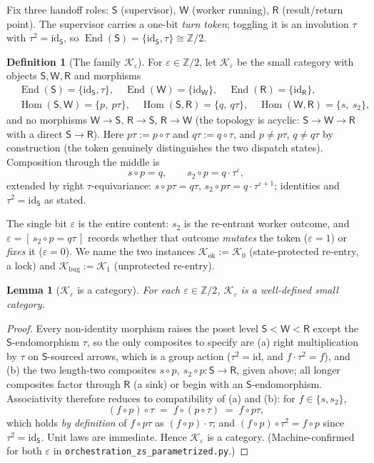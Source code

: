 \documentclass[11pt]{article}
\newtheorem{lemma}[theorem]{Lemma}
\theoremstyle{definition}
\newtheorem{definition}[theorem]{Definition}
\newcommand{\Hom}{\operatorname{Hom}}
\newcommand{\End}{\operatorname{End}}
\newcommand{\id}{\mathrm{id}}
\newcommand{\K}{\mathcal{K}}
\newcommand{\Sup}{\mathsf{S}}
\newcommand{\Wk}{\mathsf{W}}
\newcommand{\Rt}{\mathsf{R}}
\begin{document}
Fix three handoff roles: $\Sup$ (supervisor), $\Wk$ (worker running), $\Rt$
(result/return point). The supervisor carries a one-bit \emph{turn token}; toggling
it is an involution $\tau$ with $\tau^2=\id_\Sup$, so
$\End(\Sup)=\{\id_\Sup,\tau\}\cong\mathbb Z/2$.

\begin{definition}[The family $\K_\varepsilon$]\label{def:Keps}
For $\varepsilon\in\mathbb Z/2$, let $\K_\varepsilon$ be the small category with
objects $\Sup,\Wk,\Rt$ and morphisms
\[
\begin{aligned}
&\End(\Sup)=\{\id_\Sup,\tau\},\quad \End(\Wk)=\{\id_\Wk\},\quad \End(\Rt)=\{\id_\Rt\},\\
&\Hom(\Sup,\Wk)=\{p,\ p\tau\},\quad
 \Hom(\Sup,\Rt)=\{q,\ q\tau\},\quad
 \Hom(\Wk,\Rt)=\{s,\ s_2\},
\end{aligned}
\]
and no morphisms $\Wk\to\Sup$, $\Rt\to\Sup$, $\Rt\to\Wk$ (the topology is acyclic:
$\Sup\to\Wk\to\Rt$ with a direct $\Sup\to\Rt$). Here $p\tau:=p\circ\tau$ and
$q\tau:=q\circ\tau$, and $p\neq p\tau$, $q\neq q\tau$ by construction (the token
genuinely distinguishes the two dispatch states). Composition through the middle is
\[
   s\circ p=q,\qquad s_2\circ p=q\cdot\tau^{\varepsilon},
\]
extended by right $\tau$-equivariance:
$s\circ p\tau=q\tau$, $s_2\circ p\tau=q\cdot\tau^{\varepsilon+1}$; identities and
$\tau^2=\id_\Sup$ as stated.
\end{definition}

The single bit $\varepsilon$ is the entire content: $s_2$ is the re-entrant worker
outcome, and $\varepsilon=[\,s_2\circ p=q\tau\,]$ records whether that outcome
\emph{mutates} the token ($\varepsilon=1$) or \emph{fixes} it ($\varepsilon=0$). We
name the two instances $\K_{\mathrm{ok}}:=\K_0$ (state-protected re-entry, a lock)
and $\K_{\mathrm{bug}}:=\K_1$ (unprotected re-entry).

\begin{lemma}[$\K_\varepsilon$ is a category]\label{lem:cat}
For each $\varepsilon\in\mathbb Z/2$, $\K_\varepsilon$ is a well-defined small
category.
\end{lemma}

\begin{proof}
Every non-identity morphism raises the poset level $\Sup<\Wk<\Rt$ except the
$\Sup$-endomorphism $\tau$, so the only composites to specify are (a) right
multiplication by $\tau$ on $\Sup$-sourced arrows, which is a group action
($\tau^2=\id$, and $f\cdot\tau^2=f$), and (b) the two length-two composites
$s\circ p,\ s_2\circ p:\Sup\to\Rt$, given above; all longer composites factor
through $\Rt$ (a sink) or begin with an $\Sup$-endomorphism. Associativity therefore
reduces to compatibility of (a) and (b): for $f\in\{s,s_2\}$,
\[
   (f\circ p)\circ\tau \;=\; f\circ(p\circ\tau) \;=\; f\circ p\tau,
\]
which holds \emph{by definition} of $f\circ p\tau$ as $(f\circ p)\cdot\tau$; and
$(f\circ p)\circ\tau^2=f\circ p$ since $\tau^2=\id_\Sup$. Unit laws are immediate.
Hence $\K_\varepsilon$ is a category. (Machine-confirmed for both $\varepsilon$ in
\texttt{orchestration\_zs\_parametrized.py}.)
\end{proof}
\end{document}
